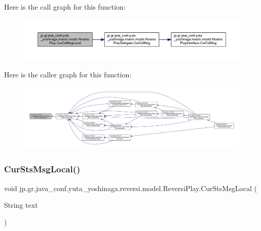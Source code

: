 Here is the call graph for this function\+:
\nopagebreak
\begin{figure}[H]
\begin{center}
\leavevmode
\includegraphics[width=350pt]{classjp_1_1gr_1_1java__conf_1_1yuta__yoshinaga_1_1reversi_1_1model_1_1_reversi_play_a0dec187d4c4372a3470fac8e341ae9e8_cgraph}
\end{center}
\end{figure}
Here is the caller graph for this function\+:
\nopagebreak
\begin{figure}[H]
\begin{center}
\leavevmode
\includegraphics[width=350pt]{classjp_1_1gr_1_1java__conf_1_1yuta__yoshinaga_1_1reversi_1_1model_1_1_reversi_play_a0dec187d4c4372a3470fac8e341ae9e8_icgraph}
\end{center}
\end{figure}
\mbox{\label{classjp_1_1gr_1_1java__conf_1_1yuta__yoshinaga_1_1reversi_1_1model_1_1_reversi_play_a4c4d14ddaf65d3643bd7edc7b562f4d1}} 
\subsubsection{\texorpdfstring{Cur\+Sts\+Msg\+Local()}{CurStsMsgLocal()}}
{\footnotesize\ttfamily void jp.\+gr.\+java\+\_\+conf.\+yuta\+\_\+yoshinaga.\+reversi.\+model.\+Reversi\+Play.\+Cur\+Sts\+Msg\+Local (\begin{DoxyParamCaption}\item[{String}]{text }\end{DoxyParamCaption})\hspace{0.3cm}{\ttfamily [private]}}



